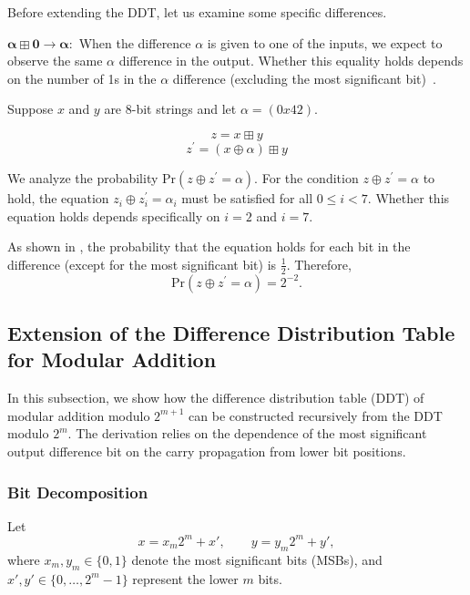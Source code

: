 \documentclass[runningheads]{llncs}
\begin{document}
Before extending the DDT, let us examine some specific differences.

\vspace{1em}

\noindent
$\pmb{\alpha \boxplus 0 \rightarrow \alpha :}$ When the difference $\alpha$ is given to one of the inputs, we expect to observe the same $\alpha$ difference in the output. Whether this equality holds depends on the number of 1s in the $\alpha$ difference (excluding the most significant bit)~\cite{hong2003differential}.

\vspace{2em}


\begin{example}
    Suppose $x$ and $y$ are 8-bit strings and let $\alpha = (0x42)$.

    \[
    z = x \boxplus y
    \]
    \[
    z^{\prime} = (x \oplus \alpha) \boxplus y
    \]
    
    We analyze the probability Pr$(z \oplus z^{\prime} = \alpha)$. For the condition $z \oplus z^{\prime} = \alpha$ to hold, the equation $z_i \oplus z^{\prime}_i = \alpha_i$ must be satisfied for all $0 \leq i < 7$. Whether this equation holds depends specifically on $i = 2$ and $i = 7$.
    
    As shown in \cite{hong2003differential}, the probability that the equation holds for each bit in the difference (except for the most significant bit) is $\frac{1}{2}$. Therefore,
    \[
    \text{Pr}(z \oplus z^{\prime} = \alpha) = 2^{-2}.
    \]
\end{example}



\subsection{Extension of the Difference Distribution Table for Modular Addition}

In this subsection, we show how the difference distribution table (DDT) of modular addition modulo $2^{m+1}$ can be constructed recursively from the DDT modulo $2^m$. The derivation relies on the dependence of the most significant output difference bit on the carry propagation from lower bit positions.

\subsubsection*{Bit Decomposition}

Let
\[
x = x_m 2^m + x', \qquad
y = y_m 2^m + y',
\]
where $x_m, y_m \in \{0,1\}$ denote the most significant bits (MSBs), and $x', y' \in \{0, \dots, 2^m-1\}$ represent the lower $m$ bits.
\end{document}
